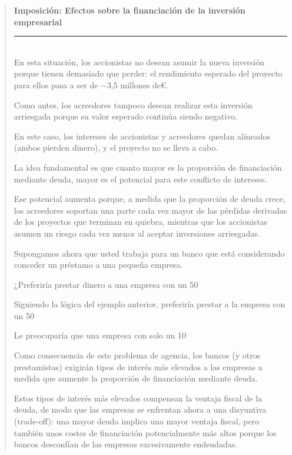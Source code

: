 \documentclass[10pt,a4paper]{article}
\newenvironment{specialblock}[1]{%
      \begin{quote} %
      \small %
      \noindent\textbf{#1}\\[-0.3em] %
      \rule{\linewidth}{0.4pt}\\[0.6em]}{
      \end{quote}}
\begin{document}
\begin{specialblock}{Imposición: Efectos sobre la financiación de la inversión empresarial}
    En esta situación, los accionistas no desean asumir la nueva inversión porque tienen demasiado que perder: el rendimiento esperado del proyecto para ellos pasa a ser de −3,5 millones de€.
    
    Como antes, los acreedores tampoco desean realizar esta inversión arriesgada porque su valor esperado continúa siendo negativo.
    
    En este caso, los intereses de accionistas y acreedores quedan alineados (ambos pierden dinero), y el proyecto no se lleva a cabo.
    
    La idea fundamental es que cuanto mayor es la proporción de financiación mediante deuda, mayor es el potencial para este conflicto de intereses.
    
    Ese potencial aumenta porque, a medida que la proporción de deuda crece, los acreedores soportan una parte cada vez mayor de las pérdidas derivadas de los proyectos que terminan en quiebra, mientras que los accionistas asumen un riesgo cada vez menor al aceptar inversiones arriesgadas.
    
    Supongamos ahora que usted trabaja para un banco que está considerando conceder un préstamo a una pequeña empresa.
    
    ¿Preferiría prestar dinero a una empresa con un 50 %
    
    Siguiendo la lógica del ejemplo anterior, preferiría prestar a la empresa con un 50 %
    
    Le preocuparía que una empresa con solo un 10 %
    
    Como consecuencia de este problema de agencia, los bancos (y otros prestamistas) exigirán tipos de interés más elevados a las empresas a medida que aumente la proporción de financiación mediante deuda.
    
    Estos tipos de interés más elevados compensan la ventaja fiscal de la deuda, de modo que las empresas se enfrentan ahora a una disyuntiva (trade-off): una mayor deuda implica una mayor ventaja fiscal, pero también unos costes de financiación potencialmente más altos porque los bancos desconfían de las empresas excesivamente endeudadas.
    

\end{specialblock}
\end{document}
